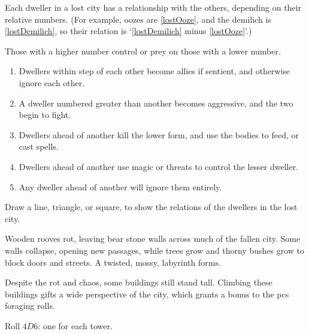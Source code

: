 \begin{multicols}{2}
Each dweller in a lost city has a relationship with the others, depending on their relative numbers.
(For example, oozes are \ref{lostOoze}, and the demilich is \ref{lostDemilich}, so their relation is `\ref{lostDemilich} minus \ref{lostOoze}'.)

Those with a higher number control or prey on those with a lower number.

\begin{enumerate}
  \item
  Dwellers within  step of each other become allies if sentient, and otherwise ignore each other.
  \item
  A dweller numbered  greater than another becomes aggressive, and the two begin to fight.
  \item
  Dwellers  ahead of another kill the lower form, and use the bodies to feed, or cast spells.
  \item
  Dwellers  ahead of another use magic or threats to control the lesser dweller.
  \item
  Any dweller  ahead of another will ignore them entirely.
\end{enumerate}

Draw a line, triangle, or square, to show the relations of the dwellers in the lost city.

\cityRelations

\label{lostTowers}

Wooden rooves rot, leaving bear stone walls across much of the fallen city.
Some walls collapse, opening new passages, while trees grow and thorny bushes grow to block doors and streets.
A twisted, mossy, labyrinth forms.

Despite the rot and chaos, some buildings still stand tall.
Climbing these buildings gifts a wide perspective of the city, which grants a bonus to the \glspl{pc} foraging rolls.

Roll $4D6$: one for each tower.


\end{multicols}
